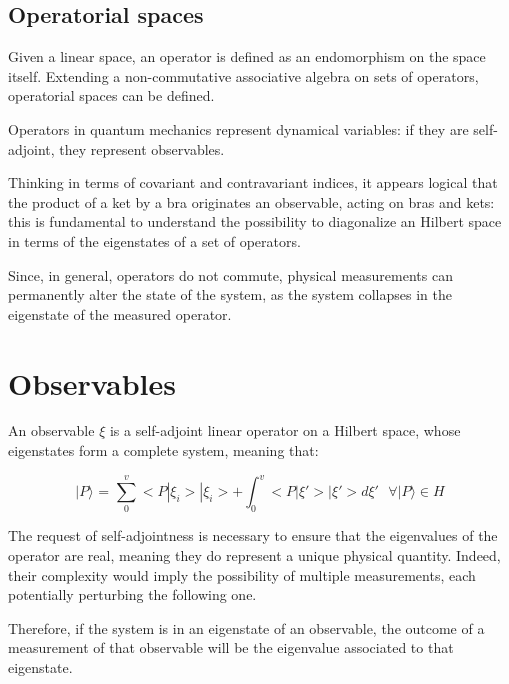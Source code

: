 \documentclass{article}
\begin{document}
\subsection{Operatorial spaces}

Given a linear space, an operator is defined as an endomorphism on the space itself.
Extending a non-commutative associative algebra on sets of operators, operatorial spaces can be defined.

Operators in quantum mechanics represent dynamical variables: if they are self-adjoint, they represent observables.

Thinking in terms of covariant and contravariant indices, it appears logical that the product of a ket by a bra originates an observable, acting on bras and kets:
this is fundamental to understand the possibility to diagonalize an Hilbert space in terms of the eigenstates of a set of operators.

Since, in general, operators do not commute, physical measurements can permanently alter the state of the system, as the system collapses in the eigenstate of the measured operator.

\section{Observables}

\begin{tcolorbox}[colframe=gray!90, colback=blue!5, coltitle=white, title=\textbf{Definition: Observable}, fonttitle=\large\bfseries]
    An observable $\xi$ is a self-adjoint linear operator on a Hilbert space, whose eigenstates form a complete system, meaning that:

    \begin{equation}
        \text{$|P\rangle$ = $\sum_{0}^{v} <P|\xi_i>|\xi_i> + \int_{0}^{v} <P|\xi'>|\xi'>d\xi'$  $\forall |P\rangle \in H$}
    \end{equation}
\end{tcolorbox}

The request of self-adjointness is necessary to ensure that the eigenvalues of the operator are real, meaning they do represent a unique physical quantity.
Indeed, their complexity would imply the possibility of multiple measurements, each potentially perturbing the following one.

Therefore, if the system is in an eigenstate of an observable, the outcome of a measurement of that observable will be the eigenvalue associated to that eigenstate.
\end{document}
